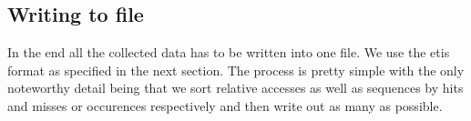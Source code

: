 \subsection{Writing to file}

In the end all the collected data has to be written into one file. We use the etis format as specified in the next section. The process is pretty simple with the only noteworthy detail being that we sort relative accesses
as well as sequences by hits and misses or occurences respectively and then write out as many as possible.

